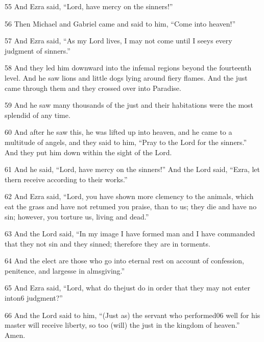 \par 55 And Ezra said, “Lord, have mercy on the sinners!”

\par 56 Then Michael and Gabriel came and said to him, “Come into heaven!”

\par 57 And Ezra said, “As my Lord lives, I may not come until I seeys every judgment of sinners.”

\par 58 And they led him downward into the infemal regions beyond the fourteenth level. And he saw lions and little dogs lying around fiery flames. And the just came through them and they crossed over into Paradise.

\par 59 And he saw many thousands of the just and their habitations were the most splendid of any time.

\par 60 And after he saw this, he was lifted up into heaven, and he came to a multitude of angels, and they said to him, “Pray to the Lord for the sinners.” And they put him down within the sight of the Lord. 

\par 61 And he said, “Lord, have mercy on the sinners!” And the Lord said, “Ezra, let thern receive according to their works.”

\par 62 And Ezra said, “Lord, you have shown more clemency to the animals, which eat the grass and have not retumed you praise, than to us; they die and have no sin; however, you torture us, living and dead.”

\par 63 And the Lord said, “In my image I have formed man and I have commanded that they not sin and they sinned; therefore they are in torments.

\par 64 And the elect are those who go into eternal rest on account of confession, penitence, and largesse in almsgiving.”

\par 65 And Ezra said, “Lord, what do thejust do in order that they may not enter inton6 judgment?”

\par 66 And the Lord said to him, “(Just as) the servant who performed06 well for his master will receive liberty, so too (will) the just in the kingdom of heaven.” Amen.


